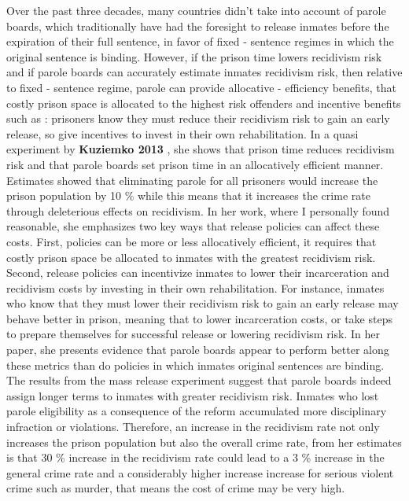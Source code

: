\documentclass[a4paper,12pt]{article}
\begin{document}
Over the past three decades, many countries didn't take into account of parole boards, which traditionally have had the foresight to release inmates before the expiration of their full sentence, in favor of fixed - sentence regimes in which the original sentence is binding. However, if the prison time lowers recidivism risk and if parole boards can accurately estimate inmates recidivism risk, then relative to fixed - sentence regime, parole can provide allocative - efficiency benefits, that costly prison space is allocated to the highest risk offenders and incentive benefits such as : prisoners know they must reduce their recidivism risk to gain an early release, so give incentives to invest in their own rehabilitation. In a quasi experiment by \textbf{Kuziemko 2013} \cite{Kuziemko2013}, she shows that prison time reduces recidivism risk and that parole boards set prison time in an allocatively efficient manner. Estimates showed that eliminating parole for all prisoners would increase the prison population by 10 \% while this means that it increases the crime rate through deleterious effects on recidivism. In her work, where I personally found reasonable, she emphasizes two key ways that release policies can affect these costs. First, policies can be more or less allocatively efficient, it requires that costly prison space be allocated to inmates with the greatest recidivism risk. Second, release policies can incentivize inmates to lower their incarceration and recidivism costs by investing in their own rehabilitation. For instance, inmates who know that they must lower their recidivism risk to gain an early release may behave better in prison, meaning that to lower incarceration costs, or take steps to prepare themselves for successful release or lowering recidivism risk. In her paper, she presents evidence that parole boards  appear to perform better along these metrics than do policies in which inmates original sentences are binding. The results from the mass release experiment suggest that parole boards indeed assign longer terms to inmates with greater recidivism risk. Inmates who lost parole eligibility as a consequence of the reform accumulated more disciplinary infraction or violations. Therefore, an increase in the recidivism rate not only increases the prison population but also the overall crime rate, from her estimates is that 30 \% increase in the recidivism rate could lead to a 3 \% increase in the general crime rate and a considerably higher increase increase for serious violent crime such as murder, that means the cost of crime may be very high. 
\end{document}
